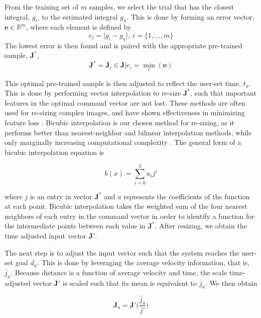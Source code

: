 \documentclass[letterpaper, 10 pt, conference]{ieeeconf}  %
\newcommand{\R}{\mathbb{R}}
\begin{document}
From the training set of $m$ samples, we select the trial that has the closest integral, $g_i$, to the estimated integral $g_u$. This is done by forming an error vector, $\mathbf{e}\in\R^{m}$, where each element is defined by
\begin{equation}
 e_i = \vert g_i-g_u \vert , ~i= \{1,\ldots,m\}
\end{equation}
 The lowest error is then found and is paired with the appropriate pre-trained sample, $\mathbf{J}^*$,
\begin{equation}
\mathbf{J}^* = \mathbf{J}_i \in \mathbf{J}\vert e_i = \min_e(\mathbf{e})
\end{equation}

This optimal pre-trained sample is then adjusted to reflect the user-set time, $t_u$. This is done by performing vector interpolation to re-size $\mathbf{J}^*$, such that important features in the optimal command vector are not lost. These methods are often used for re-sizing complex images, and have shown effectiveness in minimizing feature loss \cite{bicfeatures}. Bicubic interpolation is our chosen method for re-sizing, as it performs better than nearest-neighbor and bilinear interpolation methods, while only marginally increasing computational complexity \cite{biccomp}. The general form of a bicubic interpolation equation is 

\begin{equation} \label{eq:bicinter}
    b(x) = \sum_{i=0}^3a_ij^i
\end{equation}

where $j$ is an entry in vector $\mathbf{J}^*$ and $a$ represents the coefficients of the function at each point. Bicubic interpolation takes the weighted sum of the four nearest neighbors of each entry in the command vector in order to identify a function for the intermediate points between each value in $\mathbf{J}^*$. After resizing, we obtain the time adjusted input vector $\mathbf{J}'$.

The next step is to adjust the input vector such that the system reaches the user-set goal $d_u$. This is done by leveraging the average velocity information, that is, $\bar{j}_u$. Because distance is a function of average velocity and time, the scale time-adjusted vector $\mathbf{J}'$ is scaled such that its mean is equivalent to $\bar{j}_u$. We then obtain

\begin{equation} \label{eq:imgscale}
\mathbf{J}_a = \mathbf{J}'\bigg(\frac{\bar{j}_u}{\bar{j}'}\bigg)
\end{equation}
\end{document}
